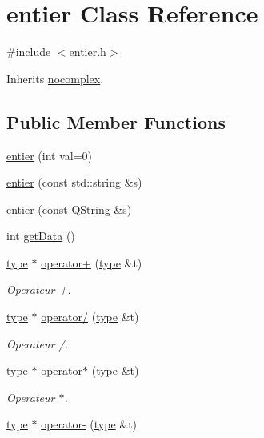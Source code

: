\hypertarget{classentier}{\section{entier Class Reference}
\label{classentier}
}


{\ttfamily \#include $<$entier.\-h$>$}



Inherits \hyperlink{classnocomplex}{nocomplex}.

\subsection*{Public Member Functions}
\begin{DoxyCompactItemize}
\item 
\hyperlink{classentier_ad1b9eb5e221dfc5006527edda8c19f8a}{entier} (int val=0)
\item 
\hyperlink{classentier_acba0d6714c5b8a2a1c587bd300a85370}{entier} (const std\-::string \&s)
\item 
\hyperlink{classentier_aeee175a8cb61246f25e1ddafefebe820}{entier} (const Q\-String \&s)
\item 
int \hyperlink{classentier_a738d3684bb420ffb5bbee2187845af85}{get\-Data} ()
\item 
\hyperlink{classtype}{type} $\ast$ \hyperlink{classentier_a531e654172d6e2fe225fad108dbb84a7}{operator+} (\hyperlink{classtype}{type} \&t)
\begin{DoxyCompactList}\small\item\em Operateur +. \end{DoxyCompactList}\item 
\hyperlink{classtype}{type} $\ast$ \hyperlink{classentier_a3bfd34b6998c5c09df0dbbadead47867}{operator/} (\hyperlink{classtype}{type} \&t)
\begin{DoxyCompactList}\small\item\em Operateur /. \end{DoxyCompactList}\item 
\hyperlink{classtype}{type} $\ast$ \hyperlink{classentier_a7314a5aad4a2c997eaea01e3aa42092a}{operator$\ast$} (\hyperlink{classtype}{type} \&t)
\begin{DoxyCompactList}\small\item\em Operateur $\ast$. \end{DoxyCompactList}\item 
\hyperlink{classtype}{type} $\ast$ \hyperlink{classentier_ac0acf2b6156ef6f5f2e034c0425e1114}{operator-\/} (\hyperlink{classtype}{type} \&t)

\end{DoxyCompactItemize}
